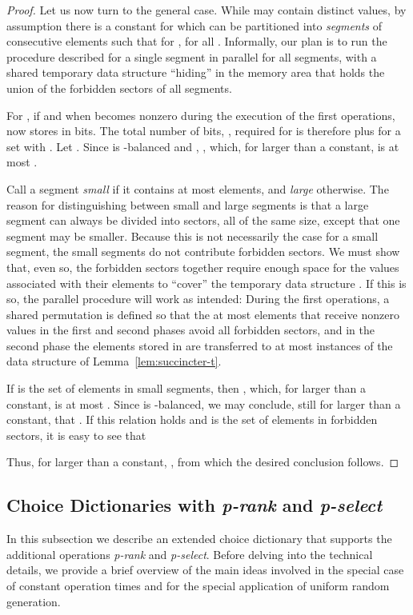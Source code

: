 \documentclass[envcountsame,envcountsect,undated,nolinenumbers]{lnthi}
\def\Tvn#1{\hbox{\textit{#1\/}}}
\begin{document}
\begin{proof}
Let us now turn to the general case.
While  may contain 
distinct values, by assumption there is a constant
 for which  can be partitioned
into  \emph{segments} 
of consecutive elements such that for
, 
for all .
Informally, our plan is to run the procedure described for
a single segment in parallel for all segments,
with a shared temporary data structure 
``hiding'' in the memory area that holds
the union of the forbidden sectors of all segments.

For ,
if and when  becomes nonzero
during the execution of the first  operations,
 now stores 
in  bits.
The total number of bits, , required for 
is therefore  plus
 for a
set  with .
Let .
Since  is -balanced
and ,
,
which, for  larger than a constant, is at most
.

Call a segment \emph{small} if it contains at
most  elements, and
\emph{large} otherwise.
The reason for distinguishing between small and
large segments is that a
large segment can always be divided into 
sectors, all of the same size, except that
one segment may be smaller.
Because this is
not necessarily the case for a small segment,
the small segments do not contribute
forbidden sectors.
We must show that, even so, the forbidden sectors
together require enough space for the values
associated with their elements to ``cover''
the temporary data structure .
If this is so, the parallel procedure will
work as intended:
During the first  operations, a shared
permutation  is defined so that the at
most  elements that receive nonzero values
in the first and second phases avoid all
forbidden sectors, and in the second phase
the elements stored in  are
transferred to at most  instances
of the data structure of Lemma~\ref{lem:succincter-t}.

If  is the set of elements in small segments,
then , which, for  larger
than a constant, is at most .
Since  is -balanced,
we may conclude, still for  larger than a
constant, that
.
If this relation holds and  is the set of
elements in forbidden sectors, it is easy to see that

Thus, for  larger than a constant,
,
from which the desired conclusion follows.
\end{proof}

\subsection{Choice Dictionaries with \Tvn{p-rank} and
 \Tvn{p-select}}
\label{subsec:random}

In this subsection we describe an extended choice
dictionary that supports the
additional operations
\Tvn{p-rank} and \Tvn{p-select}.
Before delving into the technical details, we
provide a brief overview of the main ideas
involved in the special case of constant
operation times and for the special application
of uniform random generation.
\end{document}
